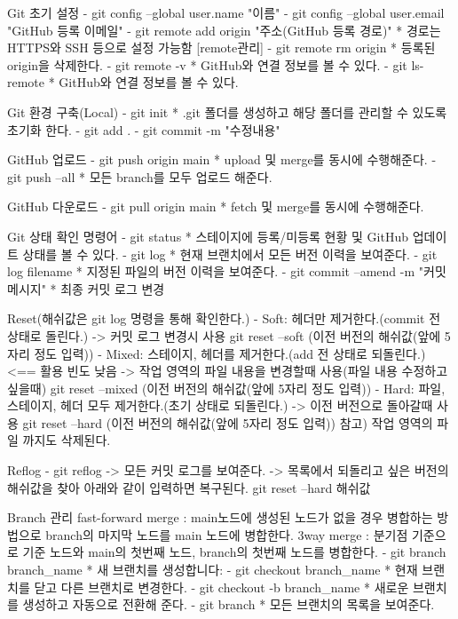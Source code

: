 
Git 초기 설정
  - git config --global user.name "이름"
  - git config --global user.email "GitHub 등록 이메일"
  - git remote add origin "주소(GitHub 등록 경로)"
    * 경로는 HTTPS와 SSH 등으로 설정 가능함
    [remote관리]
    - git remote rm origin
      * 등록된 origin을 삭제한다.
    - git remote -v 
      * GitHub와 연결 정보를 볼 수 있다.
    - git ls-remote
      * GitHub와 연결 정보를 볼 수 있다.

Git 환경 구축(Local)
  - git init 
    * .git 폴더를 생성하고 해당 폴더를 관리할 수 있도록 초기화 한다.
  - git add .
  - git commit -m "수정내용"

GitHub 업로드
  - git push origin main
    * upload 및 merge를 동시에 수행해준다.
  - git push --all
    * 모든 branch를 모두 업로드 해준다.
    
GitHub 다운로드
  - git pull origin main
    * fetch 및 merge를 동시에 수행해준다.

Git 상태 확인 명령어
  - git status
    * 스테이지에 등록/미등록 현황 및 GitHub 업데이트 상태를 볼 수 있다.
  - git log
    * 현재 브랜치에서 모든 버전 이력을 보여준다.
  - git log filename
    * 지정된 파일의 버전 이력을 보여준다.
  - git commit --amend -m "커밋 메시지"
    * 최종 커밋 로그 변경

Reset(해쉬값은 git log 명령을 통해 확인한다.)
  - Soft: 헤더만 제거한다.(commit 전 상태로 돌린다.)
    -> 커밋 로그 변경시 사용
    git reset --soft (이전 버전의 해쉬값(앞에 5자리 정도 입력))
  - Mixed: 스테이지, 헤더를 제거한다.(add 전 상태로 되돌린다.)   <== 활용 빈도 낮음
    -> 작업 영역의 파일 내용을 변경할때 사용(파일 내용 수정하고 싶을때)
    git reset --mixed (이전 버전의 해쉬값(앞에 5자리 정도 입력))
  - Hard: 파일, 스테이지, 헤더 모두 제거한다.(초기 상태로 되돌린다.)
    -> 이전 버전으로 돌아갈때 사용
    git reset --hard (이전 버전의 해쉬값(앞에 5자리 정도 입력))
    참고) 작업 영역의 파일 까지도 삭제된다.

Reflog
  - git reflog
    -> 모든 커밋 로그를 보여준다.
    -> 목록에서 되돌리고 싶은 버전의 해쉬값을 찾아 아래와 같이 입력하면 복구된다.
       git reset --hard 해쉬값

Branch 관리
fast-forward merge : main노드에 생성된 노드가 없을 경우 병합하는 방법으로 branch의 마지막 노드를 main 노드에 병합한다.
3way merge : 분기점 기준으로 기준 노드와 main의 첫번째 노드, branch의 첫번째 노드를 병합한다.
  - git branch branch_name
    * 새 브랜치를 생성합니다:
  - git checkout branch_name
    * 현재 브랜치를 닫고 다른 브랜치로 변경한다.
  - git checkout -b branch_name
    * 새로운 브랜치를 생성하고 자동으로 전환해 준다.
  - git branch
    * 모든 브랜치의 목록을 보여준다.

